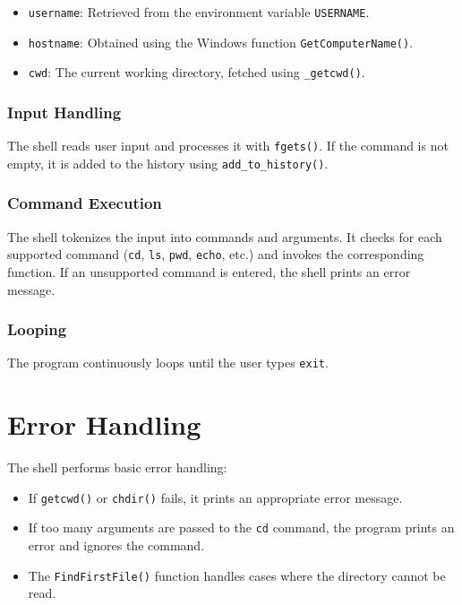 \documentclass[conference]{IEEEtran}
\begin{document}
\begin{itemize}
\item \texttt{username}: Retrieved from the environment variable \texttt{USERNAME}.
\item \texttt{hostname}: Obtained using the Windows function \texttt{GetComputerName()}.
\item \texttt{cwd}: The current working directory, fetched using \texttt{\_getcwd()}.
\end{itemize}

\subsubsection{Input Handling}
The shell reads user input and processes it with \texttt{fgets()}. If the command is not empty, it is added to the history using \texttt{add\_to\_history()}.

\subsubsection{Command Execution}
The shell tokenizes the input into commands and arguments. It checks for each supported command (\texttt{cd}, \texttt{ls}, \texttt{pwd}, \texttt{echo}, etc.) and invokes the corresponding function. If an unsupported command is entered, the shell prints an error message.

\subsubsection{Looping}
The program continuously loops until the user types \texttt{exit}.

\section{Error Handling}
The shell performs basic error handling:

\begin{itemize}
\item If \texttt{getcwd()} or \texttt{chdir()} fails, it prints an appropriate error message.
\item If too many arguments are passed to the \texttt{cd} command, the program prints an error and ignores the command.
\item The \texttt{FindFirstFile()} function handles cases where the directory cannot be read.
\end{itemize}
\end{document}
